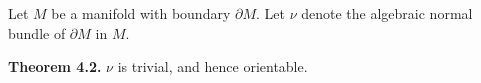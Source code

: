 Let $M$ be a manifold with boundary $\partial M$. Let $\nu$ denote the algebraic normal bundle of $\partial M$ in $M$.

\textbf{Theorem 4.2.} $\nu$ is trivial, and hence orientable.
